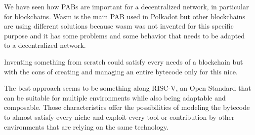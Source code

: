 We have seen how PABs are important for a decentralized network, in particular for blockchains. Wasm is the main PAB used in Polkadot but other blockchains are using different solutions because wasm was not invented for this specific purpose and it has some problems and some behavior that needs to be adapted to a decentralized network.

Inventing something from scratch could satisfy every needs of a blockchain but with the cons of creating and managing an entire bytecode only for this nice.

The best approach seems to be something along RISC-V, an Open Standard that can be suitable for multiple environments while also being adaptable and composable. Those characteristics offer the possibilities of modeling the bytecode to almost satisfy every niche and exploit every tool or contribution by other environments that are relying on the same technology.
